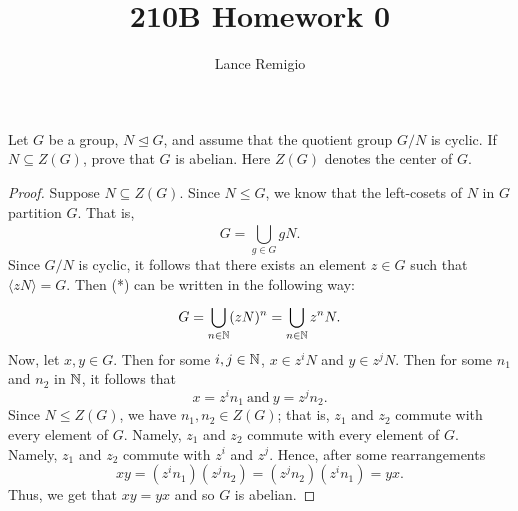 \documentclass[a4paper]{article}
\title{210B Homework 0}
\author{Lance Remigio}
\begin{document}
\maketitle

\begin{problem}
    Let \( G  \) be a group, \( N \trianglelefteq G    \), and assume that the quotient group \( G / N  \) is cyclic. If \( N \subseteq Z(G) \), prove that \( G  \) is abelian. Here \( Z(G) \) denotes the center of \( G  \).
\end{problem} 
\begin{proof}
Suppose \( N \subseteq Z(G) \). Since \( N \leq G  \), we know that the left-cosets of \( N  \) in \( G  \) partition \( G  \). That is, 
\[  G = \bigcup_{ g \in G  }^{  }  g N. \tag{*}  \]
Since \( G / N  \) is cyclic, it follows that there exists an element \( z \in G  \) such that \( \langle z N  \rangle = G  \). Then (*) can be written in the following way:
\[  G = \bigcup_{ n \in \mathbb{N}  }^{  } (zN)^{n} = \bigcup_{ n \in \mathbb{N}  }^{  }  z^{n} N.  \]
Now, let \( x,y \in G  \). Then for some \( i,j \in \mathbb{N}  \), \( x \in z^{i} N  \) and \( y \in z^{j} N  \). Then for some \( {n}_{1} \) and \( {n}_{2} \) in \( \mathbb{N}  \), it follows that
\[  x = z^{i} {n}_{1} \ \text{and} \ y = z^{j} {n}_{2}. \]
Since \( N \leq Z(G) \), we have \( {n}_{1}, {n}_{2} \in Z(G) \); that is, \( {z}_{1}  \) and \( {z}_{2} \) commute with every element of \( G  \). Namely, \( {z}_{1} \) and \( {z}_{2}  \) commute with every element of \( G  \). Namely, \( {z}_{1} \) and \( {z}_{2} \) commute with \( z^{i} \) and \( z^{j} \). Hence, after some rearrangements
\[  x y = (z^{i} {n}_{1})(z^{j}{n}_{2}) = (z^{j} {n}_{2}) (z^{i} {n}_{1}) = yx.  \]
Thus, we get that \( xy = yx  \) and so \( G  \) is abelian.
\end{proof}
\end{document}
